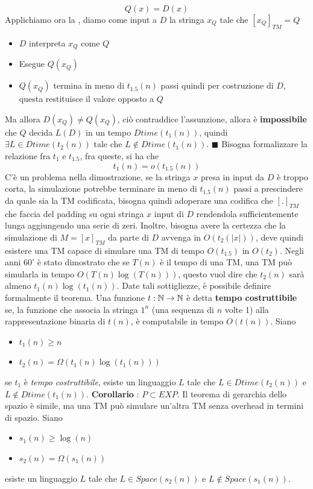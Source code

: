 \documentclass[10pt, letterpaper]{report}
\begin{document}
$$ Q(x)=D(x)$$
Applichiamo ora la , diamo come input a $D$ la stringa $x_Q$ tale che $[x_Q]_{TM}=Q$\begin{itemize}
    \item $D$ interpreta $x_Q$ come $Q$
    \item Esegue $Q(x_Q)$
    \item $Q(x_Q)$ termina in meno di $t_{1.5}(n)$ passi quindi per costruzione di $D$, questa restituisce il valore opposto a $Q$
\end{itemize}
Ma allora $D(x_Q)\ne Q(x_Q)$, ciò contraddice l'assunzione, allora è \textbf{impossibile} che $Q$ decida $L(D)$ in un tempo $Dtime(t_1(n))$, quindi $\exists L\in Dtime(t_2(n))$ tale che $L\notin Dtime(t_1(n))$.
\hfill$\blacksquare$\acc 
Bisogna formalizzare la relazione fra $t_1$ e $t_{1.5}$, fra queste, si ha che 
$$ t_1(n)=o(t_{1.5}(n))$$
C'è un problema nella dimostrazione, se la stringa $x$ presa in input da $D$ è troppo corta, la simulazione potrebbe terminare in meno di $t_{1.5}(n)$ passi a prescindere da quale sia la TM codificata, bisogna quindi adoperare una codifica che $[.]_{TM}$ che faccia del padding su ogni stringa $x$ input di $D$ rendendola sufficientemente lunga aggiungendo una serie di zeri.\acc 
Inoltre, bisogna avere la certezza che la simulazione di $M=[x]_{TM}$ da parte di $D$ avvenga in $O(t_2(|x|))$, deve quindi esistere una 
TM capace di simulare una TM di tempo $O(t_{1.5})$ in $O(t_2)$.\acc  
Negli anni 60' è stato dimostrato che se $T(n)$ è il tempo di una TM, una TM può simularla in tempo $O(T(n)\log(T(n)))$, questo vuol dire che $t_2(n)$ sarà almeno $t_1(n)\log(t_1(n))$. Date tali sottigliezze, è possibile definire formalmente il teorema.
\acc 
{} Una funzione $t:{\mathbb N}\rightarrow {\mathbb N}$ è detta \textbf{tempo costruttibile} se, la funzione che associa la stringa $1^n$ (una sequenza di $n$ volte 1) alla rappresentazione binaria di $t(n)$, è computabile in tempo $O(t(n))$.\acc
{} Siano\begin{itemize} \item $t_1(n)\ge n$ \item $t_2(n)= \Omega(t_1(n)\log(t_1(n)))$\end{itemize} se $t_1$ è \textit{tempo costruttibile}, esiste un linguaggio $L$ tale che $L\in Dtime(t_2(n))$ e $L\notin Dtime(t_1(n))$.\acc 
\textbf{Corollario} : $P\subset EXP$.\acc 
Il teorema di gerarchia dello spazio è simile, ma una TM può simulare un'altra TM senza overhead in termini di spazio.\acc 
{} Siano \begin{itemize}
    \item $s_1(n)\ge \log(n)$
    \item $s_2(n)=\Omega(s_1(n))$
\end{itemize}
esiste un linguaggio $L$ tale che $L\in Space(s_2(n))$ e $L\notin Space(s_1(n))$.\acc 
\end{document}
